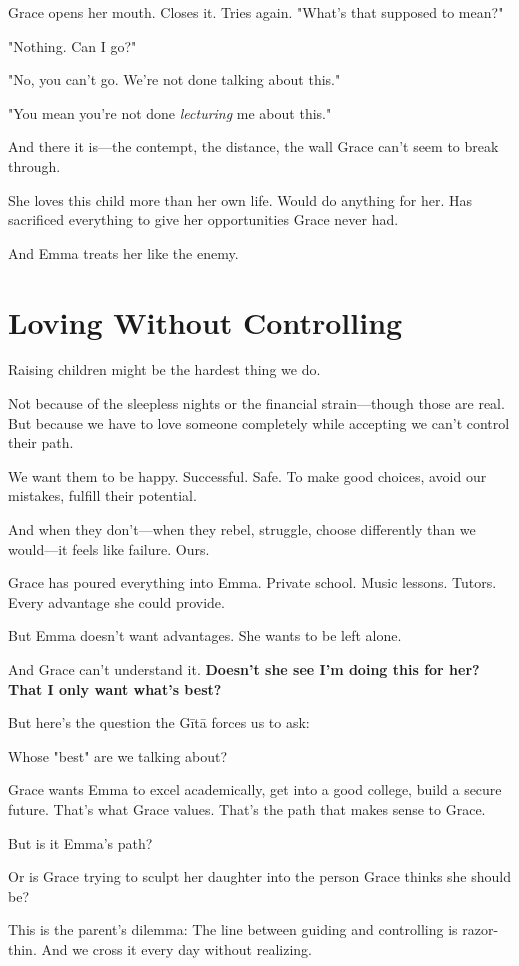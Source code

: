 \documentclass[11pt,twoside]{book}
\begin{document}
Grace opens her mouth. Closes it. Tries again. "What's that supposed to mean?"

"Nothing. Can I go?"

"No, you can't go. We're not done talking about this."

"You mean you're not done \emph{lecturing} me about this."

And there it is—the contempt, the distance, the wall Grace can't seem to break through.

She loves this child more than her own life. Would do anything for her. Has sacrificed everything to give her opportunities Grace never had.

And Emma treats her like the enemy.

\section*{Loving Without Controlling}

Raising children might be the hardest thing we do.

Not because of the sleepless nights or the financial strain—though those are real. But because we have to love someone completely while accepting we can't control their path.

We want them to be happy. Successful. Safe. To make good choices, avoid our mistakes, fulfill their potential.

And when they don't—when they rebel, struggle, choose differently than we would—it feels like failure. Ours.

Grace has poured everything into Emma. Private school. Music lessons. Tutors. Every advantage she could provide.

But Emma doesn't want advantages. She wants to be left alone.

And Grace can't understand it. \textbf{Doesn't she see I'm doing this for her? That I only want what's best?}

But here's the question the Gītā forces us to ask:

Whose "best" are we talking about?

Grace wants Emma to excel academically, get into a good college, build a secure future. That's what Grace values. That's the path that makes sense to Grace.

But is it Emma's path?

Or is Grace trying to sculpt her daughter into the person Grace thinks she should be?

This is the parent's dilemma: The line between guiding and controlling is razor-thin. And we cross it every day without realizing.
\end{document}

